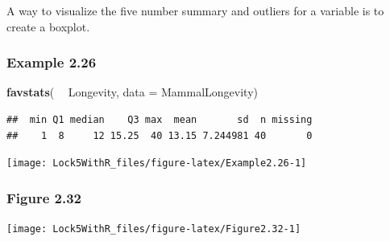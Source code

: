 \documentclass[]{book}
\newenvironment{Shaded}{\begin{snugshade}}{\end{snugshade}}
\newcommand{\DataTypeTok}[1]{\textcolor[rgb]{0.13,0.29,0.53}{#1}}
\newcommand{\KeywordTok}[1]{\textcolor[rgb]{0.13,0.29,0.53}{\textbf{#1}}}
\newcommand{\NormalTok}[1]{#1}
\newcommand{\OperatorTok}[1]{\textcolor[rgb]{0.81,0.36,0.00}{\textbf{#1}}}
\newcommand{\StringTok}[1]{\textcolor[rgb]{0.31,0.60,0.02}{#1}}
\begin{document}
A way to visualize the five number summary and outliers for a variable is to create a boxplot.

\hypertarget{example-2.26}{%
\subsubsection{Example 2.26}\label{example-2.26}}

\begin{Shaded}
\begin{Highlighting}[]
\KeywordTok{favstats}\NormalTok{( }\OperatorTok{~}\StringTok{ }\NormalTok{Longevity, }\DataTypeTok{data =}\NormalTok{ MammalLongevity)}
\end{Highlighting}
\end{Shaded}

\begin{verbatim}
##  min Q1 median    Q3 max  mean       sd  n missing
##    1  8     12 15.25  40 13.15 7.244981 40       0
\end{verbatim}

\begin{Shaded}
\end{Shaded}

\texttt{[image: Lock5WithR\_files/figure-latex/Example2.26-1]}

\hypertarget{figure-2.32}{%
\subsubsection{Figure 2.32}\label{figure-2.32}}

\begin{Shaded}
\end{Shaded}

\texttt{[image: Lock5WithR\_files/figure-latex/Figure2.32-1]}
\end{document}
